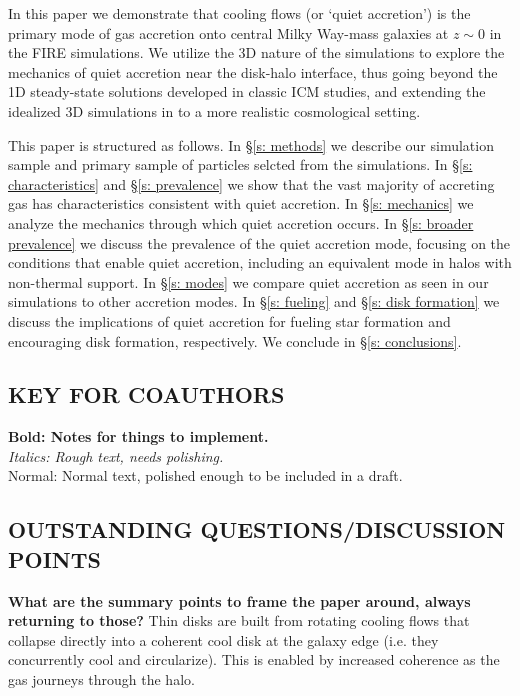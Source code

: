 \documentclass[fleqn,usenatbib]{mnras}
\begin{document}
In this paper we demonstrate that cooling flows (or `quiet accretion') is the primary mode of gas accretion onto central Milky Way-mass galaxies at $z \sim 0$ in the FIRE simulations. 
We utilize the 3D nature of the simulations to explore the mechanics of quiet accretion near the disk-halo interface, thus going beyond the 1D steady-state solutions developed in classic ICM studies, and extending the idealized 3D simulations in \cite{Stern2020} to a more realistic cosmological setting. 

This paper is structured as follows. 
In \S\ref{s: methods} we describe our simulation sample and primary sample of particles selcted from the simulations.
In \S\ref{s: characteristics} and \S\ref{s: prevalence} we show that the vast majority of accreting gas has characteristics consistent with quiet accretion.
In \S\ref{s: mechanics} we analyze the mechanics through which quiet accretion occurs.
In \S\ref{s: broader prevalence} we discuss the prevalence of the quiet accretion mode, focusing on the conditions that enable quiet accretion, including an equivalent mode in halos with non-thermal support.
In \S\ref{s: modes} we compare quiet accretion as seen in our simulations to other accretion modes.
In \S\ref{s: fueling} and \S\ref{s: disk formation} we discuss the implications of quiet accretion for fueling star formation and encouraging disk formation, respectively.
We conclude in \S\ref{s: conclusions}.


\subsection{KEY FOR COAUTHORS}
\textbf{Bold: Notes for things to implement.} \\
\textit{Italics: Rough text, needs polishing.} \\
Normal: Normal text, polished enough to be included in a draft.

\subsection{OUTSTANDING QUESTIONS/DISCUSSION POINTS}

\textbf{What are the summary points to frame the paper around, always returning to those?}
Thin disks are built from rotating cooling flows that collapse directly into a coherent cool disk at the galaxy edge (i.e. they concurrently cool and circularize).
This is enabled by increased coherence as the gas journeys through the halo.
\end{document}
